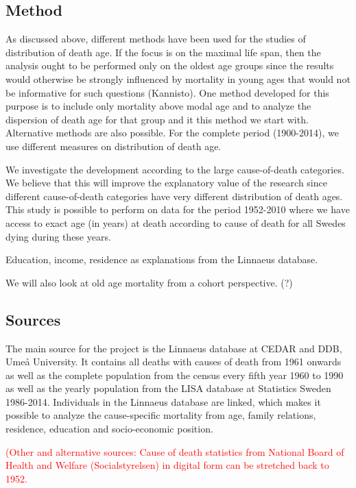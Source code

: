\documentclass[a4paper,12pt]{article}
\begin{document}
\subsection{Method}

As discussed above, different methods have been used for the studies of
distribution of death age. If the focus is on the maximal life span, then
the analysis ought to be performed only on the oldest age groups since the
results would otherwise be strongly influenced by mortality in young ages
that would not be informative for such questions (Kannisto). One method
developed for this purpose is to include only mortality above modal age and
to analyze the dispersion of death age for that group and it this method we
start with. Alternative methods are also possible. For the complete period
(1900-2014), we use different measures on distribution of death age.   

We investigate the development according to the large cause-of-death
categories. We believe that this will improve the explanatory value of the
research since different cause-of-death categories have very different
distribution of death ages. This study is possible to perform on data for
the period 1952-2010 where we have access to exact age (in years) at death
according to cause of death for all Swedes dying during these years. 

Education, income, residence as explanations from the Linnaeus database.

We will also look at old age mortality from a cohort perspective. (?)  

 
\subsection{Sources}

The main source for the project is the Linnaeus database at CEDAR and DDB,
Umeå University. It contains all deaths with causes of death from 1961
onwards as well as the complete population from the census every fifth year
1960 to 1990 as well as the yearly population from the LISA database at
Statistics Sweden 1986-2014. Individuals in the Linnaeus database are
linked, which makes it possible to analyze the cause-specific mortality
from age, family relations, residence, education and socio-economic
position.  

\textcolor{red}{
(Other and alternative sources: Cause of death statistics from National
Board of Health and Welfare (Socialstyrelsen) in digital form can be
stretched back to 1952. }
\end{document}
